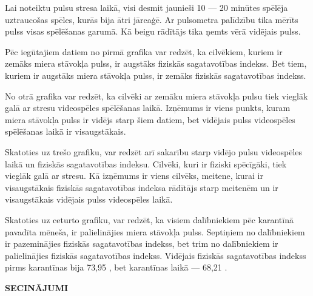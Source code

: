 \documentclass[12pt]{article}
\begin{document}
Lai noteiktu pulsu stresa laikā, visi desmit jaunieši 10 — 20 minūtes spēlēja uztraucošas spēles, kurās bija ātri jāreaģē. Ar pulsometra palīdzību tika mērīts pulss visas spēlēšanas garumā. Kā beigu rādītājs tika ņemts vērā vidējais pulss.



Pēc iegūtajiem datiem no pirmā grafika var redzēt, ka cilvēkiem, kuriem ir zemāks miera stāvokļa pulss, ir augstāks fiziskās sagatavotības indekss. Bet tiem, kuriem ir augstāks miera stāvokļa pulss, ir zemāks fiziskās sagatavotības indekss. \par
No otrā grafika var redzēt, ka cilvēki ar zemāku miera stāvokļa pulsu tiek vieglāk galā ar stresu videospēles spēlēšanas laikā. Izņēmums ir viens punkts, kuram miera stāvokļa pulss ir vidējs starp šiem datiem, bet vidējais pulss videospēles spēlēšanas laikā ir visaugstākais. \par
Skatoties uz trešo grafiku, var redzēt arī sakarību starp vidējo pulsu videospēles laikā un fiziskās sagatavotības indeksu. Cilvēki, kuri ir fiziski spēcīgāki, tiek vieglāk galā ar stresu. Kā izņēmums ir viens cilvēks, meitene, kurai ir visaugstākais fiziskās sagatavotības indeksa rādītājs starp meitenēm un ir visaugstākais vidējais pulss videospēles laikā. \par
Skatoties uz ceturto grafiku, var redzēt, ka visiem dalībniekiem pēc karantīnā pavadīta mēneša, ir palielinājies miera stāvokļa pulss. Septiņiem no dalībniekiem ir pazeminājies fiziskās sagatavotības indekss, bet trim no dalībniekiem ir palielinājies fiziskās sagatavotības indekss. Vidējais fiziskās sagatavotības indekss pirms karantīnas bija 73,95 , bet karantīnas laikā — 68,21 .

\newpage
\begin{center}
{\Large \bf SECINĀJUMI}
\end{center}
\end{document}
